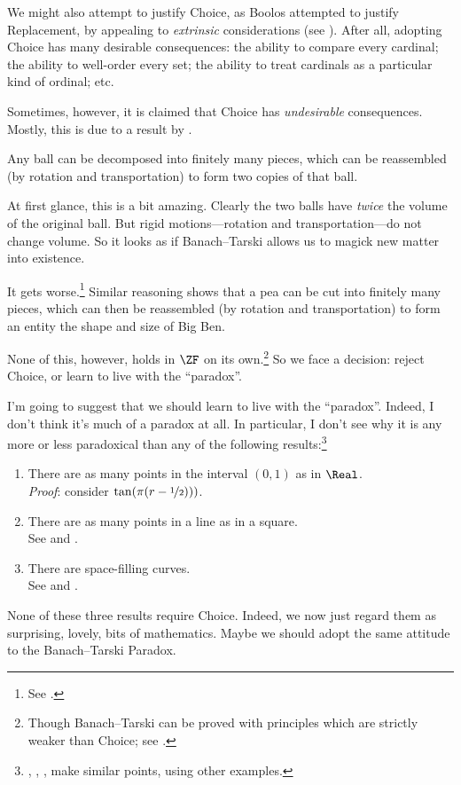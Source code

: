 \documentclass[../../../include/open-logic-section]{subfiles}
\begin{document}
We might also attempt to justify Choice, as Boolos attempted to justify Replacement, by appealing to \emph{extrinsic} considerations (see ). After all, adopting Choice has many desirable consequences: the ability to compare every cardinal; the ability to well-order every set; the ability to treat cardinals as a particular kind of ordinal; etc. 

Sometimes, however, it is claimed that Choice has \emph{undesirable} consequences. Mostly, this is due to a result by \cite{BanachTarski1924}. 
\begin{thm}
	Any ball can be decomposed into finitely many pieces, which can be reassembled (by rotation and transportation) to form two copies of that ball.
\end{thm}\noindent
At first glance, this is a bit amazing. Clearly the two balls have \emph{twice} the volume of the original ball. But rigid motions---rotation and transportation---do not change volume. So it looks as if Banach--Tarski allows us to magick new matter into existence.

It gets worse.\footnote{See \citet[Theorem 3.12]{Wagon2016}.} Similar reasoning shows that a pea can be cut into finitely many pieces, which can then be reassembled (by rotation and transportation) to form an entity the shape and size of Big Ben.

None of this, however, holds in $\ZF$ on its own.\footnote{Though Banach--Tarski can be proved with principles which are strictly weaker than Choice; see \citet[303]{Wagon2016}.} So we face a decision: reject Choice, or learn to live with the ``paradox''. 

I'm going to suggest that we should learn to live with the ``paradox''. Indeed, I don't think it's much of a paradox at all. 
In particular, I don't see why it is any more or less paradoxical than any of the following results:\footnote{\citet[276--7]{Potter2004}, \citet[16]{WestonUnpublished}, \citet[31, 308--9]{Wagon2016}, make similar points, using other examples.}
\begin{enumerate}
	\item There are as many points in the interval $(0,1)$ as in  $\Real$. 
	\\\emph{Proof}: consider $\tan(\pi(r-\nicefrac{1}{2})))$.
	\item There are as many points in a line as in a square.
	\\See {} and .
	\item There are space-filling curves. 
	\\See {} and .
\end{enumerate}
None of these three results require Choice. Indeed, we now just regard them as surprising, lovely, bits of mathematics. Maybe we should adopt the same attitude to the  Banach--Tarski Paradox.
\end{document}
